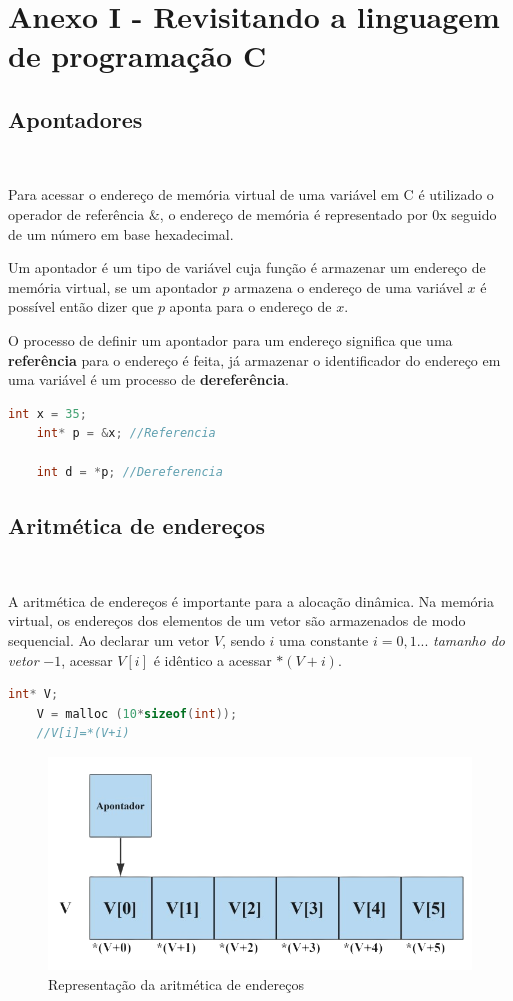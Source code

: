 \section*{Anexo I - Revisitando a linguagem de programação C}
\subsection*{Apontadores}
\

Para acessar o endereço de memória virtual de uma variável em C é utilizado o operador de referência $\&$, o endereço de memória é representado por 0x seguido de um número em base hexadecimal.

Um apontador é um tipo de variável cuja função é armazenar um endereço de memória virtual, se um apontador $p$ armazena o endereço de uma variável $x$ é possível então dizer que $p$ aponta para o endereço de $x$.

O processo de definir um apontador para um endereço significa que uma \textbf{referência} para o endereço é feita, já armazenar o identificador do endereço em uma variável é um processo de \textbf{dereferência}.

\begin{lstlisting}[language=C, frame=single]
    int x = 35;
    int* p = &x; //Referencia

    int d = *p; //Dereferencia
\end{lstlisting}

\subsection*{Aritmética de endereços}
\

A aritmética de endereços é importante para a alocação dinâmica. Na memória virtual, os endereços dos elementos de um vetor são armazenados de modo sequencial. Ao declarar um vetor $V$, sendo $i$ uma constante $i=0, 1 ...$ \textit{tamanho do vetor} $-1$, acessar $V[i]$ é idêntico a acessar $*(V+i)$.

\begin{lstlisting}[language=C, frame=single]
    int* V; 
    V = malloc (10*sizeof(int));
    //V[i]=*(V+i)
\end{lstlisting}

\newpage

\begin{figure}
  \centering
  \includegraphics[width=0.7\linewidth]{img/aritmeticaenderecos.png}
    \caption{Representação da aritmética de endereços}
    \label{aritimeticaenderecos}
\end{figure}

